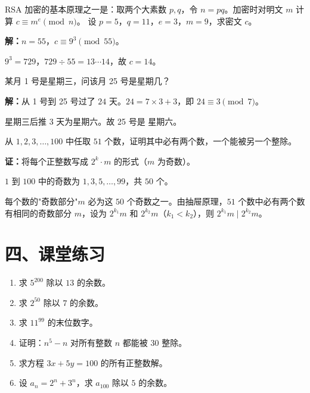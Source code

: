 \documentclass[12pt, a4paper]{ctexart}
\begin{document}
\begin{appbox}[【应用1】密码学中的同余]
RSA 加密的基本原理之一是：取两个大素数 $p, q$，令 $n = pq$。加密时对明文 $m$ 计算 $c \equiv m^e \pmod{n}$。
设 $p = 5$，$q = 11$，$e = 3$，$m = 9$，求密文 $c$。
\end{appbox}

\textbf{解：}$n = 55$，$c \equiv 9^3 \pmod{55}$。

$9^3 = 729$，$729 \div 55 = 13 \cdots 14$，故 $c = \boxed{14}$。

\begin{appbox}[【应用2】日历问题]
某月 1 号是星期三，问该月 25 号是星期几？
\end{appbox}

\textbf{解：}从 1 号到 25 号过了 $24$ 天。$24 = 7 \times 3 + 3$，即 $24 \equiv 3 \pmod{7}$。

星期三后推 3 天为星期六。故 25 号是 $\boxed{\text{星期六}}$。

\begin{appbox}[【应用3】抽屉原理与整除]
从 $1, 2, 3, \ldots, 100$ 中任取 $51$ 个数，证明其中必有两个数，一个能被另一个整除。
\end{appbox}

\textbf{证：}将每个正整数写成 $2^k \cdot m$ 的形式（$m$ 为奇数）。

$1$ 到 $100$ 中的奇数为 $1, 3, 5, \ldots, 99$，共 $50$ 个。

每个数的"奇数部分"$m$ 必为这 $50$ 个奇数之一。由抽屉原理，$51$ 个数中必有两个数有相同的奇数部分 $m$，设为 $2^{k_1} m$ 和 $2^{k_2} m$（$k_1 < k_2$），则 $2^{k_1} m \mid 2^{k_2} m$。

\section*{\textcolor{tipgreen}{四、课堂练习}}

\begin{enumerate}
  \item 求 $5^{200}$ 除以 $13$ 的余数。
  \item 求 $2^{50}$ 除以 $7$ 的余数。
  \item 求 $11^{99}$ 的末位数字。
  \item 证明：$n^5 - n$ 对所有整数 $n$ 都能被 $30$ 整除。
  \item 求方程 $3x + 5y = 100$ 的所有正整数解。
  \item 设 $a_n = 2^n + 3^n$，求 $a_{100}$ 除以 $5$ 的余数。
\end{enumerate}
\end{document}
